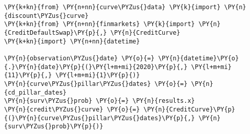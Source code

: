 \begin{Answer}
 \begin{tcolorbox}[size=fbox, boxrule=1pt,colback=cellbackground, colframe=cellborder]
\begin{Verbatim}[commandchars=\\\{\}]
\PY{k+kn}{from} \PY{n+nn}{curve\PYZus{}data} \PY{k}{import} \PY{n}{discount\PYZus{}curve}
\PY{k+kn}{from} \PY{n+nn}{finmarkets} \PY{k}{import} \PY{n}{CreditDefaultSwap}\PY{p}{,} \PY{n}{CreditCurve}
\PY{k+kn}{import} \PY{n+nn}{datetime}

\PY{n}{observation\PYZus{}date} \PY{o}{=} \PY{n}{datetime}\PY{o}{.}\PY{n}{date}\PY{p}{(}\PY{l+m+mi}{2020}\PY{p}{,} \PY{l+m+mi}{11}\PY{p}{,} \PY{l+m+mi}{1}\PY{p}{)}
\PY{n}{curve\PYZus{}pillar\PYZus{}dates} \PY{o}{=} \PY{n}{cd_pillar_dates}
\PY{n}{surv\PYZus{}prob} \PY{o}{=} \PY{n}{results.x}
\PY{n}{credit\PYZus{}curve} \PY{o}{=} \PY{n}{CreditCurve}\PY{p}{(}\PY{n}{curve\PYZus{}pillar\PYZus{}dates}\PY{p}{,} \PY{n}{surv\PYZus{}prob}\PY{p}{)}


\end{Verbatim}
\end{tcolorbox}
\end{Answer}
